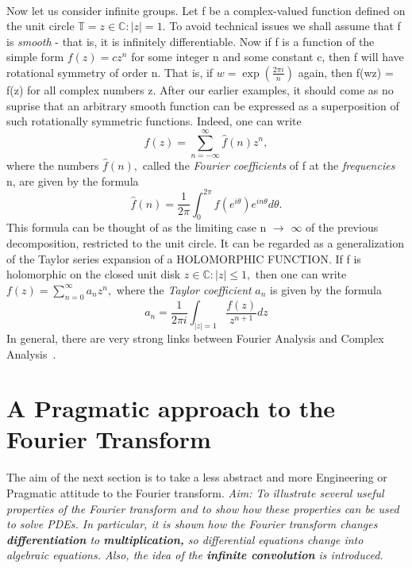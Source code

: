 \documentclass[a4paper,10pt]{article}
\numberwithin{equation}{section}
\numberwithin{figure}{section}
\theoremstyle{plain}
\begin{document}
\paragraph*{} Now let us consider infinite groups. Let f be a complex-valued function defined on the unit
circle $\mathbb{T} = {z \in \mathbb{C}:|z|=1}.$ To avoid technical issues we shall assume that f is 
\textit{smooth} - that is, it is infinitely differentiable. Now if f is a function of the simple form
$f(z) = cz^{n}$ for some integer n and some constant c, then f will have rotational symmetry of order
n. That is, if $w = \exp(\frac{2\pi i}{n})$ again, then f(wz) = f(z) for all complex numbers z. After our
earlier examples, it should come as no suprise that an arbitrary smooth function can be expressed as a 
superposition of such rotationally symmetric functions. Indeed, one can write
\begin{displaymath}
 f(z) = \sum\limits_{n=-\infty}^{\infty}\hat{f}(n)z^{n},
\end{displaymath}
where the numbers $\hat{f}(n),$ called the \textit{Fourier coefficients} of f at the \textit{frequencies}
n, are given by the formula
\begin{displaymath}
 \hat{f}(n) = \frac{1}{2\pi}\int_{0}^{2\pi}f(e^{i\theta})e^{i n\theta}d\theta.
\end{displaymath}
This formula can be thought of as the limiting case n $\rightarrow$ $\infty$ of the previous decomposition,
restricted to the unit circle. It can be regarded as a generalization of the Taylor series expansion
of a HOLOMORPHIC FUNCTION. If f is holomorphic on the closed unit disk 
${z \in \mathbb{C}:|z|\leq 1},$ then one can write
$f(z) = \sum\limits_{n=0}^{\infty}a_{n}z^{n},$
where the \textit{Taylor coefficient} $a_{n}$ is given by the formula
\begin{displaymath}
 a_{n} = \frac{1}{2\pi i}\int_{|z|=1}\frac{f(z)}{z^{n+1}}dz
\end{displaymath}
In general, there are very strong links between Fourier Analysis and Complex Analysis~\cite{RudinAnalysis}.
\section{A Pragmatic approach to the Fourier Transform}
The aim of the next section is to take a less abstract and more Engineering or Pragmatic
attitude to the Fourier transform.
\textit{Aim: To illustrate several useful properties of the Fourier transform and to show how these
properties can be used to solve PDEs. In particular, it is shown how the Fourier transform changes \textbf{differentiation}
to \textbf{multiplication,} so differential equations change into algebraic equations.
Also, the idea of the \textbf{infinite convolution} is introduced.}
\end{document}
